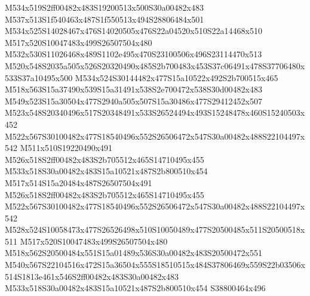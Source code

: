 \documentclass{article}
\begin{document}
\begin{multicols}{2}
M534x519S2ff00482x483S19200513x500S30a00482x483 M537x513S1f540463x487S1f550513x494S28806484x501 M534x525S14028467x476S14020505x476S22a04520x510S22a14468x510 M517x520S10047483x499S26507504x480 M532x530S11026468x489S1102e495x470S23100506x496S23114470x513 M520x548S2035a505x526S20320490x485S2b700483x453S37c06491x478S37706480x533S37a10495x500 M534x524S30144482x477S15a10522x492S2b700515x465 M518x563S15a37490x539S15a31491x538S2e700472x538S30d00482x483 M549x523S15a30504x477S2940a505x507S15a30486x477S29412452x507 M523x548S20340496x517S20348491x533S26524494x493S15248478x460S15240503x452 M522x567S30100482x477S18540496x552S26506472x547S30a00482x488S22104497x542 M511x510S19220490x491 M526x518S2ff00482x483S2b705512x465S14710495x455 M533x518S30a00482x483S15a10521x487S2b800510x454 M517x514S15a20484x487S26507504x491 M526x518S2ff00482x483S2b705512x465S14710495x455 M522x567S30100482x477S18540496x552S26506472x547S30a00482x488S22104497x542 M528x524S10058473x477S26526498x510S10050489x477S20500485x511S20500518x511 M517x520S10047483x499S26507504x480 M518x562S20500484x551S15a01489x536S30a00482x483S20500472x551 M540x567S22104516x472S15a36504x555S18510515x484S37806469x559S22b03506x514S1813e461x546S2ff00482x483S30a00482x483 M533x518S30a00482x483S15a10521x487S2b800510x454 S38800464x496








\end{multicols}
\end{document}
